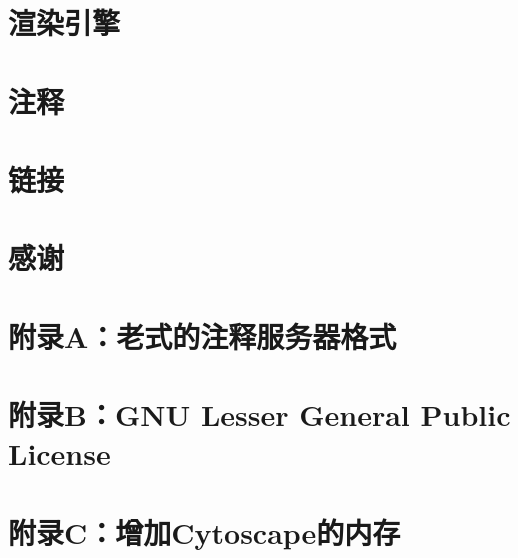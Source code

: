 \documentclass[a4paper, oneside]{book}
\begin{document}
\begin{CJK}{UTF8}{gbsn}
\chapter{渲染引擎}


\chapter{注释}


\chapter{链接}


\chapter*{感谢}


\chapter*{附录A：老式的注释服务器格式}


\chapter*{附录B：GNU Lesser General Public License}


\chapter*{附录C：增加Cytoscape的内存}


\end{CJK}
\end{document}

